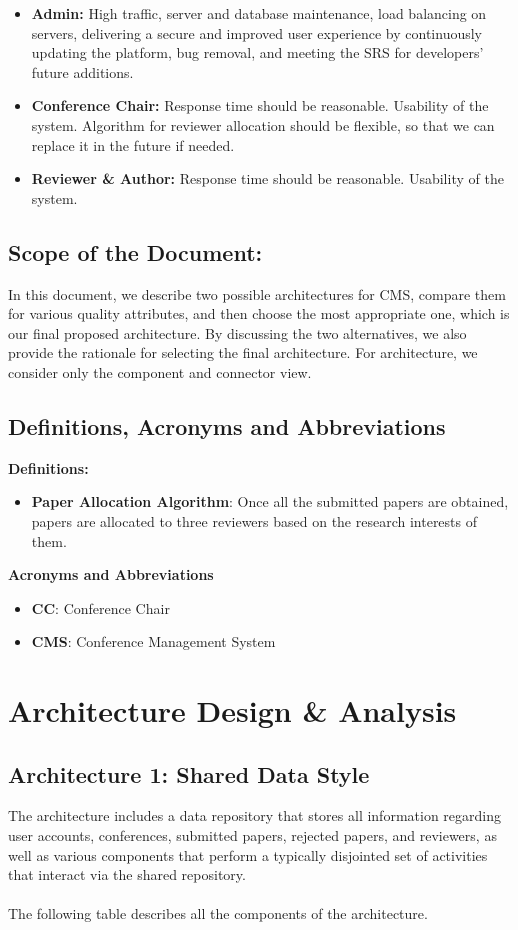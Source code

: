 \documentclass[english,a4paper,12pt]{report}
\begin{document}
\begin{itemize}
    \item \textbf{Admin: }High traffic, server and database maintenance, load balancing on servers, delivering a secure and improved user experience by continuously updating the platform, bug removal, and meeting the SRS for developers' future additions.
    \item \textbf{Conference Chair:} Response time should be reasonable. Usability of the system. Algorithm for reviewer allocation should be flexible, so that we can replace it in the future if needed. 
    \item \textbf{Reviewer \& Author:} Response time should be reasonable. Usability of the system.
\end{itemize}

\section{Scope of the Document:}
In this document, we describe two possible architectures for CMS, compare them for various quality attributes, and then choose the most appropriate one, which is our final proposed architecture. By discussing the two alternatives, we also provide the rationale for selecting
the final architecture. For architecture, we consider only the component and connector view.

\section{Definitions, Acronyms and Abbreviations}
\textbf{Definitions:}
\begin{itemize}
    \item \textbf{Paper Allocation Algorithm}: Once all the submitted papers are obtained, papers are allocated to three reviewers based on the research interests of them.
\end{itemize}
\textbf{Acronyms and Abbreviations}
\begin{itemize}
    \item \textbf{CC}: Conference Chair
    \item \textbf{CMS}: Conference Management System
\end{itemize}

\chapter{Architecture Design \& Analysis}

\section{Architecture 1: Shared Data Style}
The architecture includes a data repository that stores all information regarding user accounts, conferences, submitted papers, rejected papers, and reviewers, as well as various components that perform a typically disjointed set of activities that interact via the shared repository. \\~\\
The following table describes all the components of the architecture.
\end{document}
